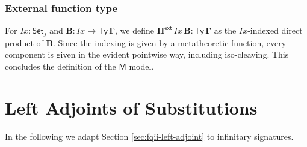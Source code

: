 \documentclass[12pt,a4paper,twoside,openany]{book}
\theoremstyle{remark}
\theoremstyle{definition}
\theoremstyle{theorem}
\newcommand{\mi}[1]{\mathit{#1}}
\newcommand{\bs}[1]{\boldsymbol{#1}}
\newcommand{\Ty}{\mathsf{Ty}}
\newcommand{\ra}{\rightarrow}
\newcommand{\Set}{\mathsf{Set}}
\newcommand{\Pie}{\Pi^{\mathsf{ext}}}
\newcommand{\bTy}{\bs{\Ty}}
\newcommand{\bGamma}{\bs{\Gamma}}
\newcommand{\bB}{\bs{B}}
\newcommand{\bPie}{\bs{\Pie}}
\newcommand{\bM}{\bs{\mathsf{M}}}
\begin{document}
\subsubsection{External function type}

For $\mi{Ix} : \Set_j$ and $\bB : \mi{Ix} \ra \bTy\,\bGamma$, we define
$\bPie\,\mi{Ix}\,\bB \bs{:} \bTy\,\bGamma$ as the $\mi{Ix}$-indexed direct
product of $\bB$. Since the indexing is given by a metatheoretic function, every
component is given in the evident pointwise way, including iso-cleaving. This
concludes the definition of the $\bM$ model.

\section{Left Adjoints of Substitutions}

In the following we adapt Section \ref{sec:fqii-left-adjoint} to infinitary
signatures.
\end{document}
